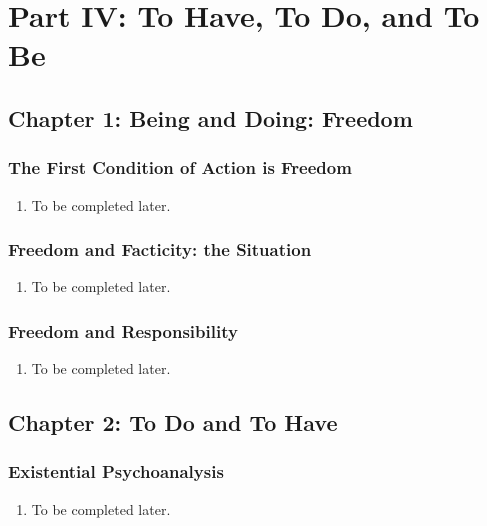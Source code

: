 \section{Part IV: To Have, To Do, and To Be}

\subsection{Chapter 1: Being and Doing: Freedom}

\subsubsection{The First Condition of Action is Freedom}

\begin{enumerate}
  \item To be completed later.
\end{enumerate}

\subsubsection{Freedom and Facticity: the Situation}

\begin{enumerate}
  \item To be completed later.
\end{enumerate}

\subsubsection{Freedom and Responsibility}

\begin{enumerate}
  \item To be completed later.
\end{enumerate}

\subsection{Chapter 2: To Do and To Have}

\subsubsection{Existential Psychoanalysis}

\begin{enumerate}
  \item To be completed later.
\end{enumerate}

